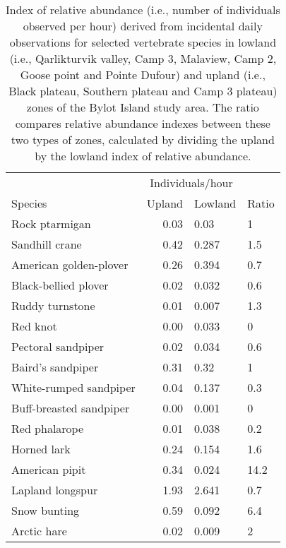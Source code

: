\begin{table}[ht]
\centering
\caption{Index of relative abundance (i.e., number of individuals observed per hour) derived from incidental daily observations for selected vertebrate species in lowland (i.e., Qarlikturvik valley, Camp 3, Malaview, Camp 2, Goose point and Pointe Dufour) and upland (i.e., Black plateau, Southern plateau and Camp 3 plateau) zones of the Bylot Island study area. The ratio compares relative abundance indexes between these two types of zones, calculated by dividing the upland by the lowland index of relative abundance.} 
\label{table:table_species_relative_abundance_upland}
\begingroup\fontsize{10pt}{10pt}\selectfont
\begin{tabularx}{0.55\textwidth}{lrll}
  \hline
  & \multicolumn{2}{c}{Individuals/hour} \\
 Species & Upland & Lowland & Ratio \\
 \hline
Rock ptarmigan & 0.03 & 0.03 & 1 \\ 
  Sandhill crane & 0.42 & 0.287 & 1.5 \\ 
  American golden-plover & 0.26 & 0.394 & 0.7 \\ 
  Black-bellied plover & 0.02 & 0.032 & 0.6 \\ 
  Ruddy turnstone & 0.01 & 0.007 & 1.3 \\ 
  Red knot & 0.00 & 0.033 & 0 \\ 
  Pectoral sandpiper & 0.02 & 0.034 & 0.6 \\ 
  Baird's sandpiper & 0.31 & 0.32 & 1 \\ 
  White-rumped sandpiper & 0.04 & 0.137 & 0.3 \\ 
  Buff-breasted sandpiper & 0.00 & 0.001 & 0 \\ 
  Red phalarope & 0.01 & 0.038 & 0.2 \\ 
  Horned lark & 0.24 & 0.154 & 1.6 \\ 
  American pipit & 0.34 & 0.024 & 14.2 \\ 
  Lapland longspur & 1.93 & 2.641 & 0.7 \\ 
  Snow bunting & 0.59 & 0.092 & 6.4 \\ 
  Arctic hare & 0.02 & 0.009 & 2 \\ 
   \hline
\end{tabularx}
\endgroup
\end{table}
